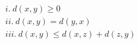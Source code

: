 \documentclass[preview]{standalone}
\begin{document}
\begin{align*}
& i. \ d(x,y) \geq 0 \\& ii. \ d(x,y)=d(y,x) \\& iii. \ d(x,y) \leq d(x,z) + d(z,y) \\&
\end{align*}
\end{document}
